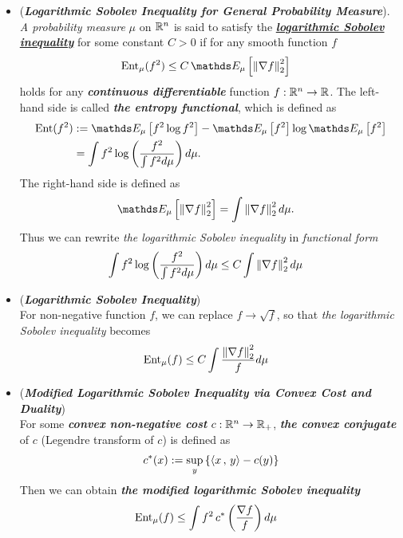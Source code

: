 \documentclass[11pt]{article}
\begin{document}
\begin{itemize}
\item \begin{definition} (\textbf{\emph{Logarithmic Sobolev Inequality for General Probability Measure}}). \\
\emph{A probability measure} $\mu$ on ${\mathbb R}^n$ is said to satisfy the \underline{\emph{\textbf{logarithmic Sobolev inequality}}}  for some constant $C > 0$ if for any smooth function $f$
\begin{align}
\text{Ent}_{\mu}(f^2) &\le C\, \E{\mu}{\norm{\nabla f}{2}^2} \label{ineqn: log_sobolev_inequality_general}
\end{align} holds for any \textbf{\emph{continuous differentiable}} function $f: {\mathbb R}^n \to {\mathbb R}$.  The left-hand side is called \textbf{\emph{the entropy functional}}, which is defined as
\begin{align*}
\text{Ent}(f^2) &:= \E{\mu}{f^2 \log f^2} - \E{\mu}{f^2}\log\E{\mu}{f^2} \\
&= \int f^2 \log\paren{\frac{f^2}{\int f^2 d\mu}} d\mu.
\end{align*} The right-hand side is defined as
\begin{align*}
\E{\mu}{\norm{\nabla f}{2}^2} &= \int \norm{\nabla f}{2}^2 d\mu.
\end{align*} Thus we can rewrite \emph{the logarithmic Sobolev inequality} in \emph{functional form}
\begin{align}
\int f^2 \log\left(\frac{f^2}{\int f^2 d\mu}\right) d\mu &\le C \int \left\|\nabla f\right\|_{2}^2 d\mu  \label{ineqn: log_sobolev_inequality_general_functional_form} 
\end{align}
\end{definition}

\item \begin{remark}(\textbf{\emph{Logarithmic Sobolev Inequality}})\\
For non-negative function $f$, we can replace $f \to \sqrt{f}$, so that \emph{the logarithmic Sobolev inequality} becomes
\begin{align}
\text{Ent}_{\mu}(f) &\le C \int \frac{\left\|\nabla f\right\|_{2}^2}{f} d\mu \label{ineqn: log_sobolev_inequality_general_v2} 
\end{align} 
\end{remark}

\item \begin{remark}(\textbf{\emph{Modified Logarithmic Sobolev Inequality via Convex Cost and Duality}})\\
For some \emph{\textbf{convex non-negative cost}} $c: {\mathbb R}^n \to {\mathbb R}_{+}$, \emph{\textbf{the convex conjugate}} of $c$ (Legendre transform of $c$) is defined as
\begin{align*}
c^{*}(x) := \sup_{y}\left\{\left\langle x\,,\, y \right\rangle - c(y) \right\}
\end{align*}
Then we can obtain \emph{\textbf{the modified logarithmic Sobolev inequality}}
\begin{align}
\text{Ent}_{\mu}(f) &\le \int f^2\, c^{*}\left(\frac{\nabla f}{f}\right) d\mu \label{ineqn: log_sobolev_inequality_general_modified} 
\end{align} 
\end{remark}
\end{itemize}
\end{document}
